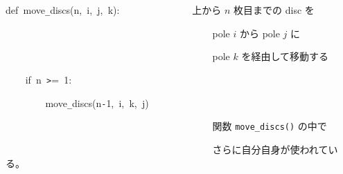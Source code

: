 \documentclass[a4paper,10pt]{article}
\def\mc{\relax}
\begin{document}
\noindent
\mbox{}\hfill

\noindent
\mbox{}def{\tt\mc \ }move{\tt\_}discs(n,{\tt\mc \ }i,{\tt\mc \ }j,{\tt\mc \ }k):{\tt\mc \ }{\tt\mc \ }{\tt\mc \ }{\tt\mc \ }{\tt\mc \ }{\tt\mc \ }{\tt\mc \ }{\tt\mc \ }{\tt\mc \ }{\tt\mc \ }{\tt\mc \ }{\tt\mc \ }{\tt\mc \ }\rm\mc {\tt\#} \ 上から $n$ 枚目までの disc を \hfill 
\tt\mc 

\noindent
\mbox{}{\tt\mc \ }{\tt\mc \ }{\tt\mc \ }{\tt\mc \ }{\tt\mc \ }{\tt\mc \ }{\tt\mc \ }{\tt\mc \ }{\tt\mc \ }{\tt\mc \ }{\tt\mc \ }{\tt\mc \ }{\tt\mc \ }{\tt\mc \ }{\tt\mc \ }{\tt\mc \ }{\tt\mc \ }{\tt\mc \ }{\tt\mc \ }{\tt\mc \ }{\tt\mc \ }{\tt\mc \ }{\tt\mc \ }{\tt\mc \ }{\tt\mc \ }{\tt\mc \ }{\tt\mc \ }{\tt\mc \ }{\tt\mc \ }{\tt\mc \ }{\tt\mc \ }{\tt\mc \ }{\tt\mc \ }{\tt\mc \ }{\tt\mc \ }{\tt\mc \ }{\tt\mc \ }{\tt\mc \ }{\tt\mc \ }{\tt\mc \ }\rm\mc {\tt\#} \ pole $i$ から pole $j$ に \hfill 
\tt\mc 

\noindent
\mbox{}{\tt\mc \ }{\tt\mc \ }{\tt\mc \ }{\tt\mc \ }{\tt\mc \ }{\tt\mc \ }{\tt\mc \ }{\tt\mc \ }{\tt\mc \ }{\tt\mc \ }{\tt\mc \ }{\tt\mc \ }{\tt\mc \ }{\tt\mc \ }{\tt\mc \ }{\tt\mc \ }{\tt\mc \ }{\tt\mc \ }{\tt\mc \ }{\tt\mc \ }{\tt\mc \ }{\tt\mc \ }{\tt\mc \ }{\tt\mc \ }{\tt\mc \ }{\tt\mc \ }{\tt\mc \ }{\tt\mc \ }{\tt\mc \ }{\tt\mc \ }{\tt\mc \ }{\tt\mc \ }{\tt\mc \ }{\tt\mc \ }{\tt\mc \ }{\tt\mc \ }{\tt\mc \ }{\tt\mc \ }{\tt\mc \ }{\tt\mc \ }\rm\mc {\tt\#} \ pole $k$ を経由して移動する \hfill 
\tt\mc 

\noindent
\mbox{}{\tt\mc \ }{\tt\mc \ }{\tt\mc \ }{\tt\mc \ }if{\tt\mc \ }n{\tt\mc \ }{\tt >}={\tt\mc \ }1:

\noindent
\mbox{}{\tt\mc \ }{\tt\mc \ }{\tt\mc \ }{\tt\mc \ }{\tt\mc \ }{\tt\mc \ }{\tt\mc \ }{\tt\mc \ }move{\tt\_}discs(n{\tt -}1,{\tt\mc \ }i,{\tt\mc \ }k,{\tt\mc \ }j)

\noindent
\mbox{}{\tt\mc \ }{\tt\mc \ }{\tt\mc \ }{\tt\mc \ }{\tt\mc \ }{\tt\mc \ }{\tt\mc \ }{\tt\mc \ }{\tt\mc \ }{\tt\mc \ }{\tt\mc \ }{\tt\mc \ }{\tt\mc \ }{\tt\mc \ }{\tt\mc \ }{\tt\mc \ }{\tt\mc \ }{\tt\mc \ }{\tt\mc \ }{\tt\mc \ }{\tt\mc \ }{\tt\mc \ }{\tt\mc \ }{\tt\mc \ }{\tt\mc \ }{\tt\mc \ }{\tt\mc \ }{\tt\mc \ }{\tt\mc \ }{\tt\mc \ }{\tt\mc \ }{\tt\mc \ }{\tt\mc \ }{\tt\mc \ }{\tt\mc \ }{\tt\mc \ }{\tt\mc \ }{\tt\mc \ }{\tt\mc \ }{\tt\mc \ }\rm\mc {\tt\#} \ 関数 {\tt move\_discs()} の中で \hfill 
\tt\mc 

\noindent
\mbox{}{\tt\mc \ }{\tt\mc \ }{\tt\mc \ }{\tt\mc \ }{\tt\mc \ }{\tt\mc \ }{\tt\mc \ }{\tt\mc \ }{\tt\mc \ }{\tt\mc \ }{\tt\mc \ }{\tt\mc \ }{\tt\mc \ }{\tt\mc \ }{\tt\mc \ }{\tt\mc \ }{\tt\mc \ }{\tt\mc \ }{\tt\mc \ }{\tt\mc \ }{\tt\mc \ }{\tt\mc \ }{\tt\mc \ }{\tt\mc \ }{\tt\mc \ }{\tt\mc \ }{\tt\mc \ }{\tt\mc \ }{\tt\mc \ }{\tt\mc \ }{\tt\mc \ }{\tt\mc \ }{\tt\mc \ }{\tt\mc \ }{\tt\mc \ }{\tt\mc \ }{\tt\mc \ }{\tt\mc \ }{\tt\mc \ }{\tt\mc \ }\rm\mc {\tt\#} \ さらに自分自身が使われている。 \hfill 
\tt\mc 
\end{document}
